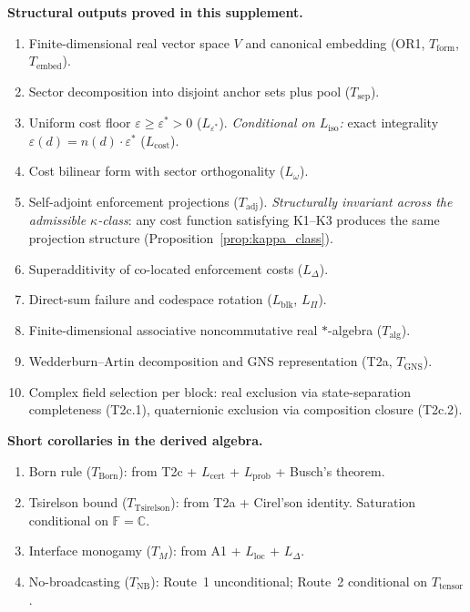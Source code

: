 \documentclass[11pt,a4paper]{article}
\theoremstyle{definition}
\newcommand{\eps}{\varepsilon}
\begin{document}
\begin{tcolorbox}[apfbox, title={What Is Assumed, What Is Proved, What Is Deferred}]
\smallskip\noindent\textbf{Structural outputs proved in this supplement.}
\begin{enumerate}[nosep,label=\arabic*.,leftmargin=2em]
\item Finite-dimensional real vector space $V$ and canonical embedding (OR1, $T_{\mathrm{form}}$, $T_{\mathrm{embed}}$).
\item Sector decomposition into disjoint anchor sets plus pool ($T_{\mathrm{sep}}$).
\item Uniform cost floor $\eps \ge \eps^* > 0$ ($L_{\eps^*}$).  \textit{Conditional on $L_{\mathrm{iso}}$:} exact integrality $\eps(d) = n(d) \cdot \eps^*$ ($L_{\mathrm{cost}}$).
\item Cost bilinear form with sector orthogonality ($L_\omega$).
\item Self-adjoint enforcement projections ($T_{\mathrm{adj}}$).  \textit{Structurally invariant across the admissible $\kappa$-class}: any cost function satisfying K1--K3 produces the same projection structure (Proposition~\ref{prop:kappa_class}).
\item Superadditivity of co-located enforcement costs ($L_\Delta$).
\item Direct-sum failure and codespace rotation ($L_{\mathrm{blk}}$, $L_\Pi$).
\item Finite-dimensional associative noncommutative real $*$-algebra ($T_{\mathrm{alg}}$).
\item Wedderburn--Artin decomposition and GNS representation (T2a, $T_{\mathrm{GNS}}$).
\item Complex field selection per block: real exclusion via state-separation completeness (T2c.1), quaternionic exclusion via composition closure (T2c.2).
\end{enumerate}

\smallskip\noindent\textbf{Short corollaries in the derived algebra.}
\begin{enumerate}[nosep,label=\arabic*.,leftmargin=2em]
\item Born rule ($T_{\mathrm{Born}}$): from T2c + $L_{\mathrm{cert}}$ + $L_{\mathrm{prob}}$ + Busch's theorem.
\item Tsirelson bound ($T_{\mathrm{Tsirelson}}$): from T2a + Cirel'son identity.  Saturation conditional on $\mathbb{F} = \mathbb{C}$.
\item Interface monogamy ($T_M$): from A1 + $L_{\mathrm{loc}}$ + $L_\Delta$.
\item No-broadcasting ($T_{\mathrm{NB}}$): Route~1 unconditional; Route~2 conditional on $T_{\mathrm{tensor}}$.
\end{enumerate}


\end{tcolorbox}
\end{document}
